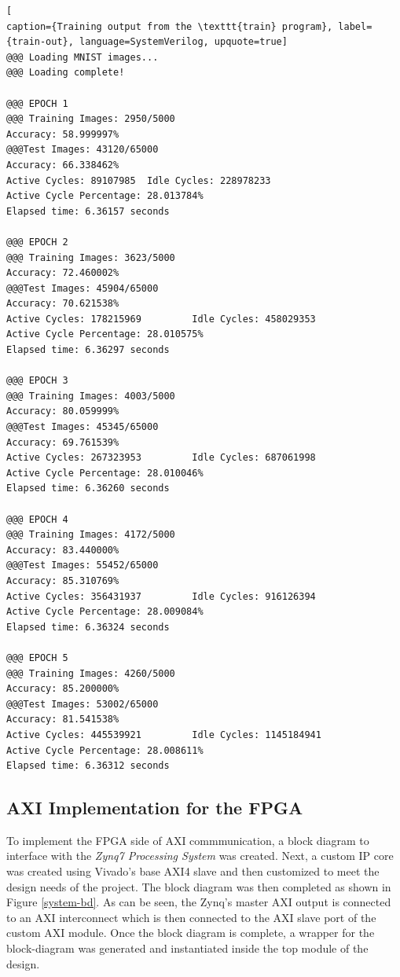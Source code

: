 \begin{lstlisting}[
caption={Training output from the \texttt{train} program}, label={train-out}, language=SystemVerilog, upquote=true]
@@@ Loading MNIST images...
@@@ Loading complete!

@@@ EPOCH 1
@@@ Training Images: 2950/5000
Accuracy: 58.999997%
@@@Test Images: 43120/65000
Accuracy: 66.338462%
Active Cycles: 89107985  Idle Cycles: 228978233
Active Cycle Percentage: 28.013784%
Elapsed time: 6.36157 seconds

@@@ EPOCH 2
@@@ Training Images: 3623/5000
Accuracy: 72.460002%
@@@Test Images: 45904/65000
Accuracy: 70.621538%
Active Cycles: 178215969         Idle Cycles: 458029353
Active Cycle Percentage: 28.010575%
Elapsed time: 6.36297 seconds

@@@ EPOCH 3
@@@ Training Images: 4003/5000
Accuracy: 80.059999%
@@@Test Images: 45345/65000
Accuracy: 69.761539%
Active Cycles: 267323953         Idle Cycles: 687061998
Active Cycle Percentage: 28.010046%
Elapsed time: 6.36260 seconds

@@@ EPOCH 4
@@@ Training Images: 4172/5000
Accuracy: 83.440000%
@@@Test Images: 55452/65000
Accuracy: 85.310769%
Active Cycles: 356431937         Idle Cycles: 916126394
Active Cycle Percentage: 28.009084%
Elapsed time: 6.36324 seconds

@@@ EPOCH 5
@@@ Training Images: 4260/5000
Accuracy: 85.200000%
@@@Test Images: 53002/65000
Accuracy: 81.541538%
Active Cycles: 445539921         Idle Cycles: 1145184941
Active Cycle Percentage: 28.008611%
Elapsed time: 6.36312 seconds
\end{lstlisting}

\subsection{AXI Implementation for the FPGA}
To implement the FPGA side of AXI commmunication, a block diagram to interface with the \textit{Zynq7 Processing System} was created. Next, a custom IP core was created using Vivado's base AXI4 slave and then customized to meet the design needs of the project. The block diagram was then completed as shown in Figure \ref{system-bd}. As can be seen, the Zynq's master AXI output is connected to an AXI interconnect which is then connected to the AXI slave port of the custom AXI module. Once the block diagram is complete, a wrapper for the block-diagram was generated and instantiated inside the top module of the design.

